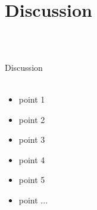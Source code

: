 \documentclass[aspectratio=169]{beamer}
\begin{document}
\section{Discussion}
\begin{frame}{~}
\begin{columns}[onlytextwidth]
\begin{block}{Discussion}
~~\\
~~\\
\begin{itemize}
\item point 1
\vskip0.5cm
\item point 2
\vskip0.5cm
\item point 3 
\vskip0.5cm
\item point 4
\vskip0.5cm
\item point 5
\vskip0.5cm
\item point ...
\vskip0.5cm
~
\end{itemize} 
\end{block}
\end{columns}
\end{frame}
\end{document}
